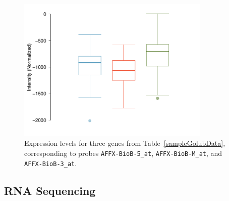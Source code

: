 
\begin{figure}[ht]
	\centering
	\includegraphics[width=0.82\textwidth]
	{ch_intro_to_data_oi_biostat/figures/golubSampleGenesBoxplot/golubSampleGenesBoxplot.pdf}
	\caption{Expression levels for three genes from Table~\ref{sampleGolubData}, corresponding to probes \texttt{AFFX-BioB-5\_at}, \texttt{AFFX-BioB-M\_at}, and \texttt{AFFX-BioB-3\_at}.}
	\label{golubSampleGenesBoxplot}
\end{figure}



\newpage

\subsection{RNA Sequencing}

